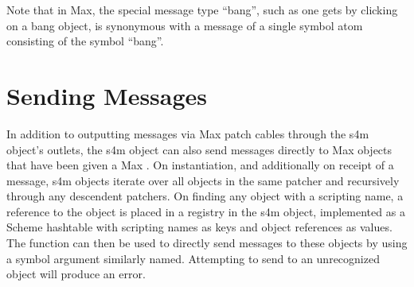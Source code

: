 \documentclass[letterpaper,10pt,english]{sphinxmanual}
\begin{document}
\begin{sphinxVerbatim}[commandchars=\\\{\}]
\end{sphinxVerbatim}

\sphinxAtStartPar
Note that in Max, the special message type “bang”, such as one gets by clicking on a bang object,
is synonymous with a message of a single symbol atom consisting of the symbol “bang”.


\section{Sending Messages}
\label{\detokenize{features_usage:sending-messages}}
\sphinxAtStartPar
In addition to outputting messages via Max patch cables through the s4m object’s outlets,
the s4m object can also send messages directly to Max objects that have been given a Max .
On instantiation, and additionally on receipt of a  message, s4m objects
iterate over all objects in the same patcher and recursively through
any descendent patchers. On finding any object with a scripting name, a reference
to the object is placed in a registry in the s4m object, implemented as a Scheme hash\sphinxhyphen{}table
with scripting names as keys and object references as values.
The  function can then be used to directly send messages to these objects by using
a symbol argument similarly named.
Attempting to send to an unrecognized object will produce an error.
\end{document}
